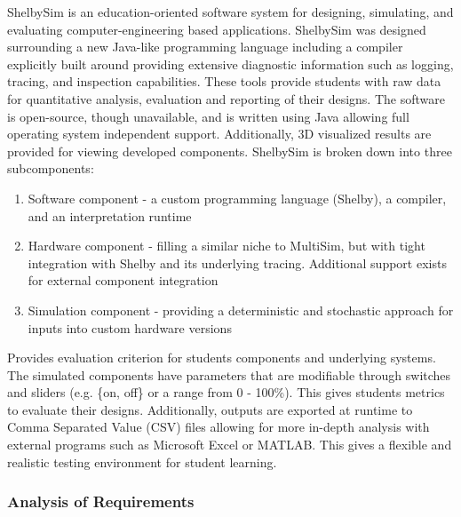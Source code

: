 ShelbySim is an education-oriented software system for designing, simulating, and evaluating computer-engineering based applications\cite{Tappan2009, Tappan2009-2}. ShelbySim was designed surrounding a new Java-like programming language including a compiler explicitly built around providing extensive diagnostic information such as logging, tracing, and inspection capabilities. These tools provide students with raw data for quantitative analysis, evaluation and reporting of their designs. The software is open-source, though unavailable, and is written using Java allowing full operating system independent support. Additionally, 3D visualized results are provided for viewing developed components. ShelbySim is broken down into three subcomponents:
\begin{enumerate}
    \item Software component - a custom programming language (Shelby), a compiler, and an interpretation runtime
    \item Hardware component - filling a similar niche to MultiSim, but with tight integration with Shelby and its underlying tracing. Additional support exists for external component integration
    \item Simulation component - providing a deterministic and stochastic approach for inputs into custom hardware versions
\end{enumerate} 

Provides evaluation criterion for students components and underlying systems. The simulated components have parameters that are modifiable through switches and sliders (e.g. \{on, off\} or a range from 0 - 100\%). This gives students metrics to evaluate their designs. Additionally, outputs are exported at runtime to Comma Separated Value (CSV) files allowing for more in-depth analysis with external programs such as Microsoft Excel or MATLAB. This gives a flexible and realistic testing environment for student learning. 

\subsubsection*{Analysis of Requirements}

